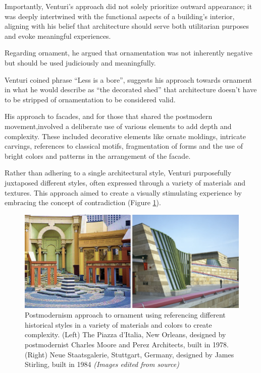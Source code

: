 Importantly, Venturi's approach did not solely prioritize outward appearance;
it was deeply intertwined with the functional aspects of a building's interior, aligning with his belief that architecture should serve both utilitarian purposes and evoke meaningful experiences.

Regarding ornament, he argued that ornamentation was not inherently negative but should be used judiciously and meaningfully.

Venturi coined phrase ``Less is a bore'', suggests his approach towards ornament in what he would describe as ``the decorated shed''\cite{Venturi1972} that architecture doesn't have to be stripped of ornamentation to be considered valid.

His approach to facades, and for those that shared the postmodern movement,involved a deliberate use of various elements to add depth and complexity.
These included decorative elements like ornate moldings, intricate carvings, references to classical motifs, fragmentation of forms and the use of bright colors and patterns in the arrangement of the facade\cite{McLaughlin2023}.

Rather than adhering to a single architectural style, Venturi purposefully juxtaposed different styles, often expressed through a variety of materials and textures.
This approach aimed to create a visually stimulating experience by embracing the concept of contradiction (Figure \ref{fig:postmodernOrnamnet}).

     \begin{figure}[htb]
          \centering
          \includegraphics[width= \linewidth]{Images/PostmodernOrnament}
          \caption{Postmodernism approach to ornament using referencing different historical styles in a variety of materials and colors to create complexity. (Left) The Piazza d’Italia, New Orleans, designed by  postmodernist Charles Moore and Perez Architects, built in 1978. (Right) Neue Staatsgalerie, Stuttgart, Germany, designed by James Stirling, built in 1984 \textit{(Images edited from source)}}
          \label{fig:postmodernOrnamnet}
        \end{figure}


